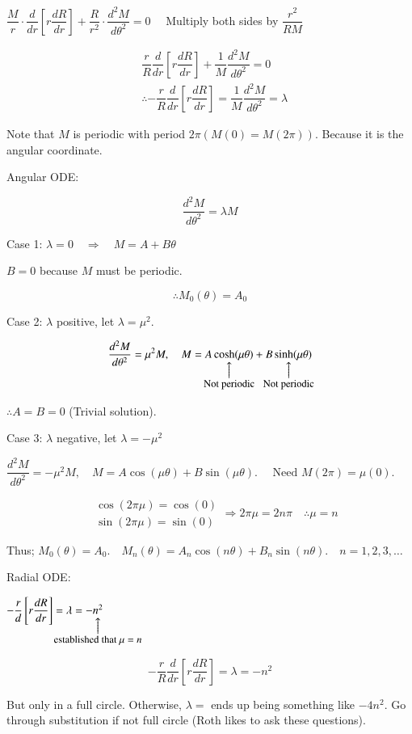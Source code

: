 \documentclass{report}
\makeatletter
\newcommand\parrow[3][3ex]{%
 \begin{array}[t]{@{}c@{}} #2 \\
  \left\uparrow\vcenter{\hrule height #1}\right.\kern-\nulldelimiterspace\\
  \makebox[0pt]{\small#3}
  \end{array}%
}
\makeatother
\begin{document}
$\dfrac{M}{r} \cdot \dfrac{d}{d r}\left[r \dfrac{d R}{d r}\right]+\dfrac{R}{r^{2}} \cdot \dfrac{d^{2} M}{d \theta^{2}}=0 \quad$ Multiply both sides by $\dfrac{r^{2}}{R M}$

$$
\begin{aligned}
& \dfrac{r}{R} \dfrac{d}{d r}\left[r \dfrac{d R}{d r}\right]+\dfrac{1}{M} \dfrac{d^{2} M}{d \theta^{2}}=0 \\
& \therefore-\dfrac{r}{R} \dfrac{d}{d r}\left[r \dfrac{d R}{d r}\right]=\dfrac{1}{M} \dfrac{d^{2} M}{d \theta^{2}}=\lambda
\end{aligned}
$$

Note that $M$ is periodic with period $2 \pi(M(0)=M(2 \pi))$. Because it is the angular coordinate.

Angular ODE:

$$
\dfrac{d^{2} M}{d \theta^{2}}=\lambda M
$$

Case 1: $\lambda=0\quad \Rightarrow\quad M=A+B \theta$

$B=0$ because $M$ must be periodic.

$$
\therefore M_{0}(\theta)=A_{0}
$$

Case 2: $\lambda$ positive, let $\lambda=\mu^{2}$.

$$
\dfrac{d^{2} M}{d \theta^{2}}=\mu^{2} M,\quad M=\parrow{A \cosh (\mu \theta)}{Not periodic}+\parrow{B \sinh (\mu \theta)}{Not periodic}
$$

$\therefore A=B=0$ (Trivial solution).

Case 3: $\lambda$ negative, let $\lambda=-\mu^{2}$

$\dfrac{d^{2} M}{d \theta^{2}}=-\mu^{2} M, \quad M=A \cos (\mu \theta)+B \sin (\mu \theta). \quad \text { Need } M(2 \pi)=\mu(0).$

$$
\begin{aligned}
& \cos (2 \pi \mu)=\cos (0)  \\
& \sin (2 \pi \mu)=\sin (0)
\end{aligned} \Rightarrow 2 \pi \mu=2 n \pi \quad \therefore \mu=n
$$

Thus; $M_{0}(\theta)=A_{0}. \quad M_{n}(\theta)=A_{n} \cos (n \theta)+B_{n} \sin (n \theta) . \quad n=1,2,3, \ldots$

Radial ODE:

$-\dfrac{r}{d}\left[r \dfrac{d R}{d r}\right]=\lambda=-\parrow{n^{2}}{established that $\mu=n$}$

\[
-\frac{r}{R} \frac{d}{d r}\left[r \frac{d R}{d r}\right]=\lambda=-n^{2}
\]

But only in a full circle. Otherwise, $\lambda=$ ends up being something like $-4 n^{2}$. Go through substitution if not full circle (Roth likes to ask these questions).
\end{document}
